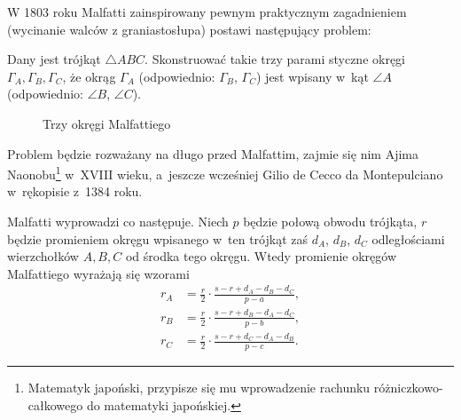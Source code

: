 %

W 1803 roku Malfatti \cite{malfatti_1803} zainspirowany pewnym praktycznym zagadnieniem (wycinanie walców z graniastosłupa) postawi następujący problem:
%

\begin{problem}
	\label{malfatti_problem}
	Dany jest trójkąt $\triangle ABC$.
	Skonstruować takie trzy parami styczne okręgi $\Gamma_A, \Gamma_B, \Gamma_C$, że okrąg $\Gamma_A$ (odpowiednio: $\Gamma_B$, $\Gamma_C$) jest wpisany w~kąt $\angle A$ (odpowiednio: $\angle B$, $\angle C$).
\end{problem}

\begin{figure}[H] \centering
\begin{comment}
\begin{tikzpicture}[scale=.5]
\tkzDefPoints{0/0/A,10/2/B,6/7/C}
\tkzDefPoints{4.43012726/2.59439459/Oa}
\tkzDefCircle[R](Oa,1.67519375895) \tkzGetPoint{Oaa}
\tkzDrawCircle[line width=0.2mm](Oa,Oaa)

\tkzDefPoints{7.48168986/2.91734309/Ob}
\tkzDefCircle[R](Ob,1.39341015784) \tkzGetPoint{Obb}
\tkzDrawCircle[line width=0.2mm](Ob,Obb)

\tkzDefPoints{5.96721113/5.06490116/Oc}
\tkzDefCircle[R](Oc,1.23445046858) \tkzGetPoint{Occ}
\tkzDrawCircle[line width=0.2mm](Oc,Occ)

\tkzLabelPoint(A){$A$}
\tkzLabelPoint[anchor=center](Oa){$\Gamma_A$}
\tkzLabelPoint(B){$B$}
\tkzLabelPoint[anchor=center](Ob){$\Gamma_B$}
\tkzLabelPoint[above](C){$C$}
\tkzLabelPoint[anchor=center](Oc){$\Gamma_C$}
\tkzDrawPolygon[line width=0.3mm](A,B,C)
\end{tikzpicture}
\end{comment}
\caption{Trzy okręgi Malfattiego}
\end{figure}

Problem będzie rozważany na długo przed Malfattim, zajmie się nim Ajima Naonobu\footnote{Matematyk japoński, przypisze się mu wprowadzenie rachunku różniczkowo-całkowego do matematyki japońskiej.} w~XVIII wieku, a~jeszcze wcześniej Gilio de Cecco da Montepulciano w~rękopisie z~1384 roku.
%
%

Malfatti wyprowadzi co następuje.
Niech $p$ będzie połową obwodu trójkąta, $r$ będzie promieniem okręgu wpisanego w~ten trójkąt zaś $d_A$, $d_B$, $d_C$ odległościami wierzchołków $A, B, C$ od środka tego okręgu.
Wtedy promienie okręgów Malfattiego wyrażają się wzorami
\begin{align}
	r_A & = \frac r 2 \cdot {\frac {s-r+d_A-d_B-d_C}{p-a}}, \\
	r_B & = \frac r 2 \cdot {\frac {s-r+d_B-d_A-d_C}{p-b}}, \\
	r_C & = \frac r 2 \cdot {\frac {s-r+d_C-d_A-d_B}{p-c}}.
\end{align}

